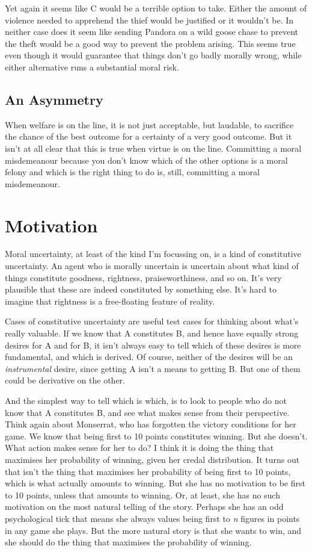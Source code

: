 \documentclass[
  10pt,
  letterpaper,
  twoside]{scrbook}
\begin{document}
Yet again it seems like C would be a terrible option to take. Either the
amount of violence needed to apprehend the thief would be justified or
it wouldn't be. In neither case does it seem like sending {Pandora} on a
wild goose chase to prevent the theft would be a good way to prevent the
problem arising. This seems true even though it would guarantee that
things don't go badly morally wrong, while either alternative runs a
substantial moral risk.

\subsection{An Asymmetry}\label{anasymmetry}

When welfare is on the line, it is not just acceptable, but laudable, to
sacrifice the chance of the best outcome for a certainty of a very good
outcome. But it isn't at all clear that this is true when virtue is on
the line. Committing a moral misdemeanour because you don't know which
of the other options is a moral felony and which is the right thing to
do is, still, committing a moral misdemeanour.

\section{Motivation}\label{motivation}

Moral uncertainty, at least of the kind I'm focussing on, is a kind of
constitutive uncertainty. An agent who is morally uncertain is uncertain
about what kind of things constitute goodness, rightness,
praiseworthiness, and so on. It's very plausible that these are indeed
constituted by something else. It's hard to imagine that rightness is a
free-floating feature of reality.

Cases of constitutive uncertainty are useful test cases for thinking
about what's really valuable. If we know that A constitutes B, and hence
have equally strong desires for A and for B, it isn't always easy to
tell which of these desires is more fundamental, and which is derived.
Of course, neither of the desires will be an \emph{instrumental} desire,
since getting A isn't a means to getting B. But one of them could be
derivative on the other.

And the simplest way to tell which is which, is to look to people who do
not know that A constitutes B, and see what makes sense from their
perspective. Think again about {Monserrat}, who has forgotten the
victory conditions for her game. We know that being first to 10 points
constitutes winning. But she doesn't. What action makes sense for her to
do? I think it is doing the thing that maximises her probability of
winning, given her credal distribution. It turns out that isn't the
thing that maximises her probability of being first to 10 points, which
is what actually amounts to winning. But she has no motivation to be
first to 10 points, unless that amounts to winning. Or, at least, she
has no such motivation on the most natural telling of the story. Perhaps
she has an odd psychological tick that means she always values being
first to \emph{n} figures in points in any game she plays. But the more
natural story is that she wants to win, and she should do the thing that
maximises the probability of winning.
\end{document}
